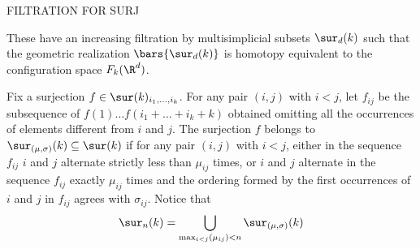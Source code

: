FILTRATION FOR SURJ

These have an increasing filtration by multisimplicial subsets $\sur_d(k)$ such that the geometric realization $\bars{\sur_d(k)}$ is homotopy equivalent to the configuration space
$F_k(\R^d)$.

\begin{definition}
	Fix a surjection $f\in \sur(k)_{i_{1},\dots,i_{k}}$.
	For any pair $(i,j)$ with $i< j$, let $f_{ij}$ be the subsequence of $f(1) \dots f(i_1+\dots+i_k+k)$ obtained omitting all the occurrences of elements different from $i$ and $j$.
	The surjection $f$ belongs to $\sur_{(\mu,\sigma)}(k)\subseteq \sur(k)$ if for any pair $(i,j)$ with $i< j$, either in the sequence $f_{ij}$ $i$ and $j$ alternate strictly less than $\mu_{ij}$ times,
	or $i$ and $j$ alternate in the sequence $f_{ij}$  exactly $\mu_{ij}$ times and the ordering formed by the first occurrences of $i$ and $j$ in $f_{ij}$ agrees with $\sigma_{ij}$.
	Notice that
	\begin{equation*}
		\sur_{n}(k)=\bigcup_{\max_{i<j}(\mu_{ij})< n} \sur_{(\mu,\sigma)}(k)
	\end{equation*}
\end{definition}

